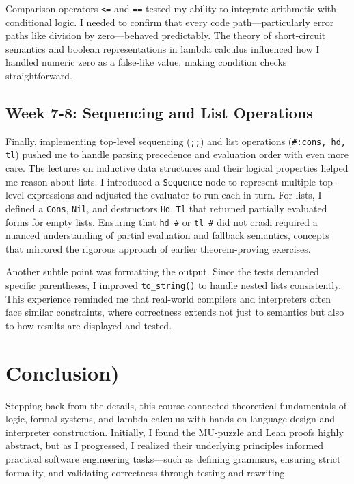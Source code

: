 \documentclass{article}
\theoremstyle{theorem}
\theoremstyle{definition}
\theoremstyle{remark}
\begin{document}
Comparison operators \texttt{<=} and \texttt{==} tested my ability to integrate arithmetic with conditional logic. I needed to confirm that every code path—particularly error paths like division by zero—behaved predictably. The theory of short-circuit semantics and boolean representations in lambda calculus influenced how I handled numeric zero as a false-like value, making condition checks straightforward.

\subsection*{Week 7-8: Sequencing and List Operations}

Finally, implementing top-level sequencing (\texttt{;;}) and list operations (\texttt{#:cons, hd, tl}) pushed me to handle parsing precedence and evaluation order with even more care. The lectures on inductive data structures and their logical properties helped me reason about lists. I introduced a \texttt{Sequence} node to represent multiple top-level expressions and adjusted the evaluator to run each in turn. For lists, I defined a \texttt{Cons}, \texttt{Nil}, and destructors \texttt{Hd}, \texttt{Tl} that returned partially evaluated forms for empty lists. Ensuring that \texttt{hd #} or \texttt{tl #} did not crash required a nuanced understanding of partial evaluation and fallback semantics, concepts that mirrored the rigorous approach of earlier theorem-proving exercises.

Another subtle point was formatting the output. Since the tests demanded specific parentheses, I improved \texttt{to\_string()} to handle nested lists consistently. This experience reminded me that real-world compilers and interpreters often face similar constraints, where correctness extends not just to semantics but also to how results are displayed and tested.

\section*{Conclusion)}

Stepping back from the details, this course connected theoretical fundamentals of logic, formal systems, and lambda calculus with hands-on language design and interpreter construction. Initially, I found the MU-puzzle and Lean proofs highly abstract, but as I progressed, I realized their underlying principles informed practical software engineering tasks—such as defining grammars, ensuring strict formality, and validating correctness through testing and rewriting.
\end{document}
